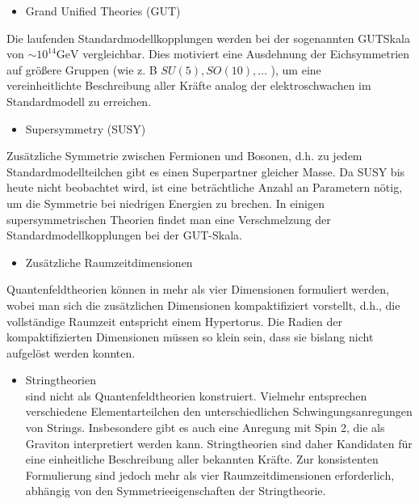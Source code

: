 \documentclass[10pt, letterpaper]{article}
\begin{document}
\begin{itemize}
  \item Grand Unified Theories (GUT)
\end{itemize}

Die laufenden Standardmodellkopplungen werden bei der sogenannten GUTSkala von $\sim 10^{14} \mathrm{GeV}$ vergleichbar. Dies motiviert eine Ausdehnung der Eichsymmetrien auf größere Gruppen (wie z. B $S U(5), S O(10), \ldots$ ), um eine\\
vereinheitlichte Beschreibung aller Kräfte analog der elektroschwachen im Standardmodell zu erreichen.

\begin{itemize}
  \item Supersymmetry (SUSY)
\end{itemize}

Zusätzliche Symmetrie zwischen Fermionen und Bosonen, d.h. zu jedem Standardmodellteilchen gibt es einen Superpartner gleicher Masse. Da SUSY bis heute nicht beobachtet wird, ist eine beträchtliche Anzahl an Parametern nötig, um die Symmetrie bei niedrigen Energien zu brechen. In einigen supersymmetrischen Theorien findet man eine Verschmelzung der Standardmodellkopplungen bei der GUT-Skala.

\begin{itemize}
  \item Zusätzliche Raumzeitdimensionen
\end{itemize}

Quantenfeldtheorien können in mehr als vier Dimensionen formuliert werden, wobei man sich die zusätzlichen Dimensionen kompaktifiziert vorstellt, d.h., die vollständige Raumzeit entspricht einem Hypertorus. Die Radien der kompaktifizierten Dimensionen müssen so klein sein, dass sie bislang nicht aufgelöst werden konnten.

\begin{itemize}
  \item Stringtheorien\\
sind nicht als Quantenfeldtheorien konstruiert. Vielmehr entsprechen verschiedene Elementarteilchen den unterschiedlichen Schwingungsanregungen von Strings. Insbesondere gibt es auch eine Anregung mit Spin 2, die als Graviton interpretiert werden kann. Stringtheorien sind daher Kandidaten für eine einheitliche Beschreibung aller bekannten Kräfte. Zur konsistenten Formulierung sind jedoch mehr als vier Raumzeitdimensionen erforderlich, abhängig von den Symmetrieeigenschaften der Stringtheorie.
\end{itemize}
\end{document}
